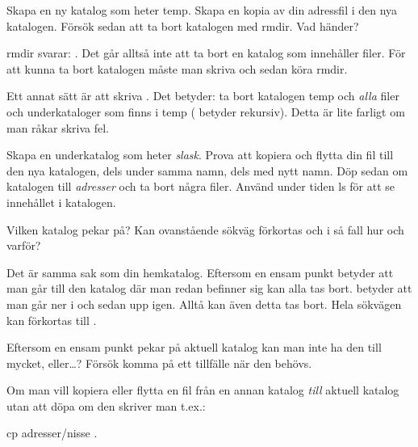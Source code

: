 \documentclass[a4paper,twocolumn]{book}
\begin{document}
\begin{exercise}
  Skapa en ny katalog som heter temp. Skapa en kopia av din adressfil
  i den nya katalogen. Försök sedan att ta bort katalogen med
  rmdir. Vad händer?
  \begin{answer}
    rmdir svarar: . Det går
    alltså inte att ta bort en katalog som innehåller filer. För att
    kunna ta bort katalogen måste man skriva  och
    sedan köra rmdir.

    Ett annat sätt är att skriva . Det betyder: ta
    bort katalogen temp och \emph{alla} filer och underkataloger som
    finns i temp ( betyder rekursiv). Detta är lite
    farligt om man råkar skriva fel.
  \end{answer}
\end{exercise}
\begin{exercise}
  Skapa en underkatalog som heter \emph{slask}. Prova att kopiera och
  flytta din fil till den nya katalogen, dels under samma namn, dels
  med nytt namn. Döp sedan om katalogen till \emph{adresser} och ta
  bort några filer.  Använd under tiden ls för att se innehållet i
  katalogen.
\end{exercise}

\begin{exercise}
  Vilken katalog pekar  på? Kan
  ovanstående sökväg förkortas och i så fall hur och varför?
  \begin{answer}
    Det är samma sak som din hemkatalog. Eftersom en ensam punkt
    betyder att man går till den katalog där man redan befinner sig
    kan alla  tas bort.  betyder att
    man går ner i  och sedan upp igen. Alltå kan även
    detta tas bort. Hela sökvägen kan förkortas till \ST{\~{}}.
  \end{answer}
\end{exercise}
\begin{exercise}
  Eftersom en ensam punkt pekar på aktuell katalog kan man inte ha den
  till mycket, eller\ldots? Försök komma på ett tillfälle när den behövs.
  \begin{answer}
    Om man vill kopiera eller flytta en fil från en annan katalog
    \emph{till} aktuell katalog utan att döpa om den skriver man t.ex.:
    \begin{ttquote}
      cp adresser/nisse .
    \end{ttquote}
  \end{answer}
\end{exercise}
\end{document}
